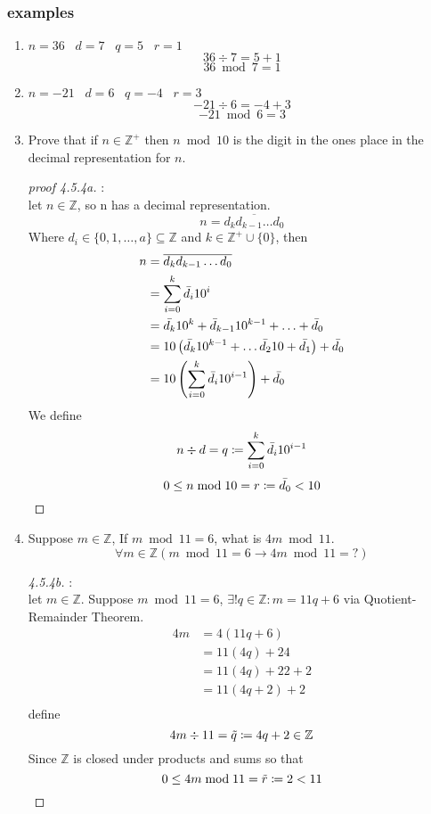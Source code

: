 \documentclass[12pt]{book}
\newcommand{\Z}{\mathbb{Z}}
\newcommand{\paren}[1]{\left( #1 \right)}
\newcommand{\zero}{\{0\}}
\begin{document}
\subsubsection{examples}
\begin{enumerate}
    \item $n=36\;\;\; d=7 \;\;\; q=5\;\;\; r=1  $
    \[
    36 \div 7 = 5 + 1
    \]
    \[
    36 \bmod 7 = 1
    \]
    \item $n=-21\;\;\;d=6\;\;\;q=-4\;\;\;r=3$
    \[
    -21 \div 6 = -4 + 3
    \]
    \[
    -21 \bmod 6 = 3 
    \]
    \newpage
    \item Prove that if $n\in \Z^+$ then $n \bmod 10$ is the digit in the ones place in the decimal representation for $n$.
    \begin{proof}[proof 4.5.4a]:\\
        let $n\in \Z$, so n has a decimal representation.
        \[
        n = \overline{d_k d_{k-1}\ldots d_0}
        \]
        Where $d_i \in \{0,1,\ldots,a\} \subseteq \Z$ and 
        $k \in \Z^+ \cup \zero$, then
        \begin{align*}
            n &= \overline{d_k d_{k-1}\ldots d_0}\\
              &=\sum_{i=0}^{k} \Bar{d_i}10^i\\
              &= \Bar{d_k}10^k + \Bar{d}_{k-1}10^{k-1}+\ldots+\Bar{d}_0\\
              &= 10 \paren{\Bar{d_k}10^{k-1}+\ldots \Bar{d_2}10+\Bar{d_1}}+\Bar{d_0}\\
              &= 10\paren{\sum_{i=0}^{k} \Bar{d_i}10^{i-1}}+\Bar{d_0}
        \end{align*}
        We define
        \[
        n \div d = q \coloneqq \sum_{i=0}^{k} \Bar{d_i}10^{i-1}
        \]
        \[
        0 \leq n \bmod 10 = r \coloneqq \Bar{d_0}<10
        \]
                
        
        \end{proof}

        \item Suppose $m\in \Z$, If $m \bmod 11 = 6$, what is $4m \bmod 11$.
        \[
        \forall m \in \Z \paren{m \bmod 11 = 6 \rightarrow 4m \bmod 11 = ?}
        \]
        \begin{proof}[4.5.4b]:\\
            let $m \in \Z$. Suppose $ m \bmod 11 = 6$, $\exists! q \in \Z : m = 11q+6$  via Quotient-Remainder Theorem.
            \begin{align*}
                4m  &= 4(11q+6)\\
                    &= 11(4q) + 24\\
                    &=11(4q)+22+2\\
                    &= 11(4q+2)+2\\
            \end{align*}
            define
            \[
            4m \div 11 = \Tilde{q} \coloneqq 4q+ 2 \in \Z
            \]
            Since $\Z$ is closed under products and sums so that 
            \[
            0 \leq 4m \bmod 11 = \Tilde{r} \coloneqq 2 < 11
            \]
            

\end{proof}
\end{enumerate}
\end{document}
